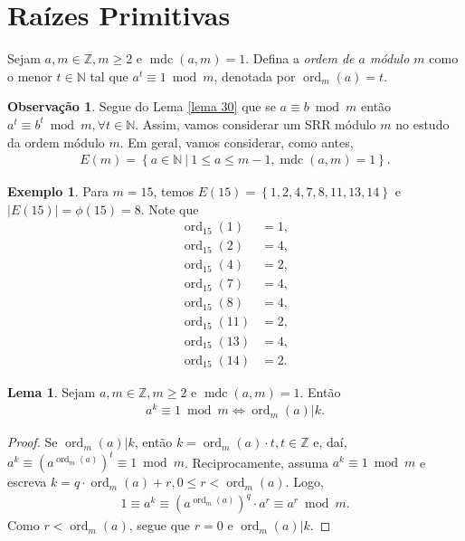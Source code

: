 \documentclass[a4paper,11pt,twoside, leqno]{article}
\DeclareMathOperator{\mdc}{mdc}
\DeclareMathOperator{\Ord}{ord}
\theoremstyle{definition}
\newtheorem{lemma}[theorem]{Lema}
\newtheorem{remark}{Observação}[section]
\newtheorem*{example}{Exemplo}
\begin{document}
\section{Raízes Primitivas}
\hspace{12pt} Sejam $a,m\in\mathbb{Z}, m\geq 2$ e $\mdc(a,m) = 1$. Defina a {\em ordem de $a$ módulo $m$} como o menor $t\in\mathbb{N}$ tal que $a^t\equiv 1\bmod m$, denotada por $\Ord _m(a) = t$.
\begin{remark}
	Segue do Lema \eqref{lema 30} que se $a\equiv b\bmod m$ então $a^t\equiv b^t\bmod m, \forall t\in\mathbb{N}$. Assim, vamos considerar um SRR módulo $m$ no estudo da ordem módulo $m$. Em geral, vamos considerar, como antes,
	\begin{align*}
	E(m) = \left\{ a\in\mathbb{N}\ | \ 1\leq a\leq m-1, \mdc(a,m) = 1 \right\}.
	\end{align*}
\end{remark}
\begin{example}
	Para $m=15$, temos $E(15) = \left\{ 1,2,4,7,8,11,13,14 \right\}$ e $|E(15)| = \phi(15) = 8$. Note que
	\begin{align*}
	\Ord_{15}(1) &= 1, \\
	\Ord_{15}(2) &= 4, \\
	\Ord_{15}(4) &= 2, \\
	\Ord_{15}(7) &= 4, \\
	\Ord_{15}(8) &= 4, \\
	\Ord_{15}(11) &= 2, \\
	\Ord_{15}(13) &= 4, \\
	\Ord_{15}(14) &= 2.
	\end{align*}
\end{example}
\begin{lemma}
	\label{lema 66}
	Sejam $a,m\in\mathbb{Z}, m\geq 2$ e $\mdc(a,m) = 1$. Então
	\begin{align*}
	a^k\equiv 1\bmod m \Leftrightarrow \Ord_m(a)|k.
	\end{align*}
\end{lemma}
\begin{proof}
	Se $\Ord_m(a)|k$, então $k = \Ord_m(a)\cdot t, t\in\mathbb{Z}$ e, daí, $a^k\equiv \left( a^{\Ord_m(a)} \right)^t\equiv 1\bmod m$. Reciprocamente, assuma $a^k\equiv 1\bmod m$ e escreva $k = q\cdot\Ord_m(a) + r, 0\leq r < \Ord_m(a)$. Logo,
	\begin{align*}
	1\equiv a^k \equiv\left( a^{\Ord_m(a)} \right)^q\cdot a^r\equiv a^r\bmod m.
	\end{align*}
	Como $r<\Ord_m(a)$, segue que $r = 0$ e $\Ord_m(a)|k$.
\end{proof}
\end{document}
